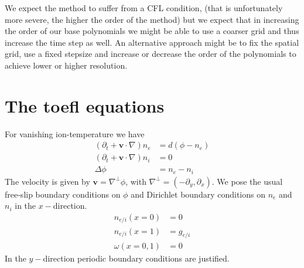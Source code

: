 \documentclass[a4paper,12pt]{scrartcl}
\renewcommand{\vec}[1]{{\mathbf{#1}}}
\begin{document}
We expect the method to suffer from a CFL condition, (that is unfortunately more severe, the 
higher the order of the method) but we expect that in increasing the order of 
our base polynomials we might be able to use a coarser grid and thus increase the 
time step as well. An alternative approach might be to fix the spatial grid,
use a fixed stepsize and increase or decrease the order of the polynomials to 
achieve lower or higher resolution. 

\section{The toefl equations}
For vanishing ion-temperature we have
\begin{subequations}
    \begin{align}
        (\partial_t + \vec v \cdot \nabla )n_e &= d(\phi - n_e) \\
        (\partial_t + \vec v \cdot \nabla )n_i &= 0\\
        \Delta \phi &= n_e - n_i
    \end{align}
    \label{eq:toefl}
\end{subequations}
The velocity is given by $\vec v = \nabla^{\perp}\phi$, with $\nabla^{\perp} = (-\partial_y, \partial_x)$.
We pose the usual free-slip boundary conditions on $\phi$ and Dirichlet boundary 
conditions on $n_e$ and $n_i$ in the $x-$direction. 
\begin{align}
    n_{e/i}(x=0) &= 0\\
    n_{e/i}(x=1) &= g_{e/i}\\
    \omega( x=0,1) &= 0
    \label{eq:boundary}
\end{align}
In the $y-$direction periodic boundary conditions are justified.
\end{document}
